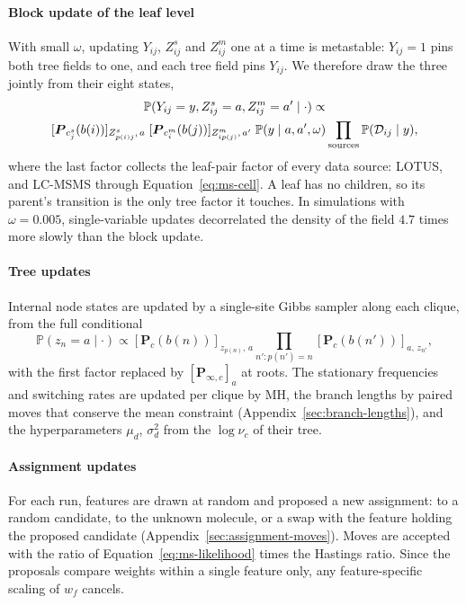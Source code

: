 \documentclass[
11pt, %
oneside, %
english, %
singlespacing, %
headsepline, %
chapterinoneline, %
]{MastersDoctoralThesis} %
\def\P{\mathbb{P}}
\def\bP{\boldsymbol{P}}
\def\D{{\cal D}}
\begin{document}
\paragraph{Block update of the leaf level} With small $\omega$, updating $Y_{ij}$, $Z^s_{ij}$ and $Z^m_{ij}$ one at a time is metastable: $Y_{ij}=1$ pins both tree fields to one, and each tree field pins $Y_{ij}$. We therefore draw the three jointly from their eight states,
\begin{multline}
	\label{eq:block}
	\P(Y_{ij} = y, Z^s_{ij} = a, Z^m_{ij} = a' \mid \cdot) \propto \\
	[\bP_{c^s_j}(b(i))]_{Z^s_{p(i)j},\, a}\;
	[\bP_{c^m_i}(b(j))]_{Z^m_{i p(j)},\, a'}\;
	\P(y \mid a, a', \omega)
	\prod_{\text{sources}} \P(\D_{ij} \mid y),
\end{multline}
where the last factor collects the leaf-pair factor of every data source: LOTUS, and LC-MSMS through Equation~\eqref{eq:ms-cell}. A leaf has no children, so its parent's transition is the only tree factor it touches. In simulations with $\omega = 0.005$, single-variable updates decorrelated the density of the field $4.7$ times more slowly than the block update.

\paragraph{Tree updates} Internal node states are updated by a single-site Gibbs sampler along each clique, from the full conditional
\begin{equation*}
	\P(z_n = a \mid \cdot) \propto [\bP_c(b(n))]_{z_{p(n)},\, a} \prod_{n' : p(n') = n} [\bP_c(b(n'))]_{a,\, z_{n'}},
\end{equation*}
with the first factor replaced by $[\bP_{\infty,c}]_a$ at roots. The stationary frequencies and switching rates are updated per clique by MH, the branch lengths by paired moves that conserve the mean constraint (Appendix~\ref{sec:branch-lengths}), and the hyperparameters $\mu_d$, $\sigma^2_d$ from the $\log \nu_c$ of their tree.

\paragraph{Assignment updates} For each run, features are drawn at random and proposed a new assignment: to a random candidate, to the unknown molecule, or a swap with the feature holding the proposed candidate (Appendix~\ref{sec:assignment-moves}). Moves are accepted with the ratio of Equation~\eqref{eq:ms-likelihood} times the Hastings ratio. Since the proposals compare weights within a single feature only, any feature-specific scaling of $w_f$ cancels.
\end{document}
